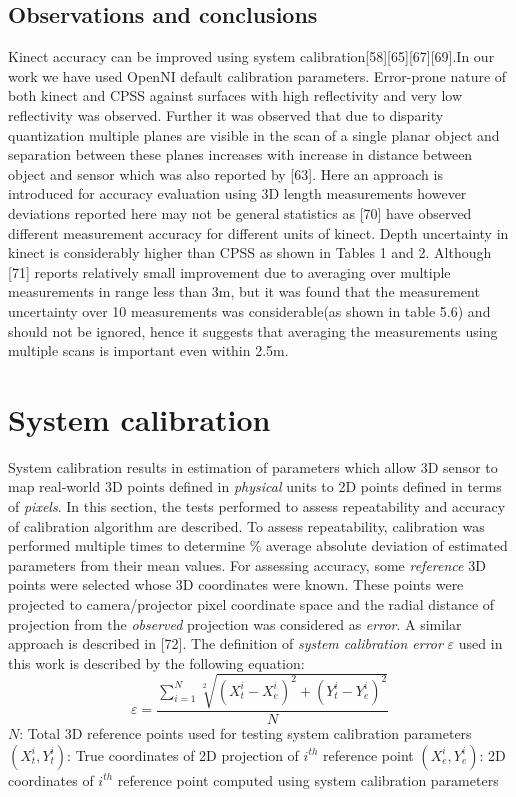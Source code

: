 \subsection{Observations and conclusions}
\label{sec-4}
Kinect accuracy can be improved using system calibration[58][65][67][69].In our work we have used OpenNI default calibration parameters. Error-prone nature of both kinect and CPSS against surfaces with high reflectivity and very low reflectivity was observed. Further it was observed that due to disparity quantization multiple planes are visible in the scan of a single planar object and separation between these planes increases with increase in distance between object and sensor which was also reported by [63]. Here an approach is introduced for accuracy evaluation using 3D length measurements however deviations reported here may not be general statistics as [70] have observed different measurement accuracy for different units of kinect. Depth uncertainty in kinect is considerably higher than CPSS as shown in Tables 1 and 2. Although [71] reports relatively small improvement due to averaging over multiple measurements in range less than 3m, but it was found that the measurement uncertainty over 10 measurements was considerable(as shown in table 5.6) and should not be ignored, hence it suggests that averaging the measurements using multiple scans is important even within 2.5m.



\section{System calibration}
System calibration results in estimation of parameters which allow 3D sensor to map real-world 3D points defined in \textit{physical} units to 2D points defined in terms of \textit{pixels}. In this section, the tests performed to assess repeatability and accuracy of calibration algorithm are described. To assess repeatability, calibration was performed multiple times to determine \% average absolute deviation of estimated parameters from their mean values. For assessing accuracy, some \textit{reference} 3D points were selected whose 3D coordinates were known. These points were projected to camera/projector pixel coordinate space and the radial distance of projection from the \textit{observed} projection was considered as \textit{error}. A similar approach is described in [72]. The definition of \textit{system calibration error} $\varepsilon$ used in this work is described by the following equation:
\begin{equation}
\varepsilon=\frac{\sum_{i=1}^N\sqrt[2]{(X_t^i-X_e^i)^2+(Y_t^i-Y_e^i)^2}}{N}
\end{equation}
\noindent
$N$: Total 3D reference points used for testing system calibration parameters\newline
$(X_t^i,Y_t^i)$: True coordinates of 2D projection of $i^{th}$ reference point\newline
$(X_e^i,Y_e^i)$: 2D coordinates of $i^{th}$ reference point computed using system calibration parameters\newline

